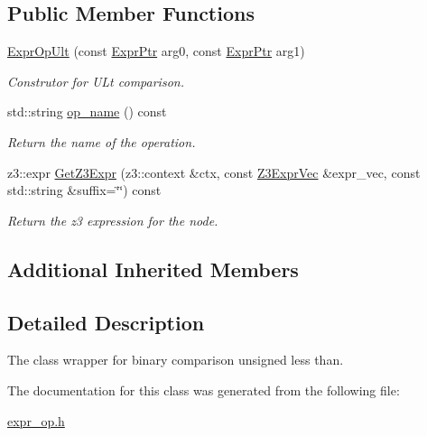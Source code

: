 \subsection*{Public Member Functions}
\begin{DoxyCompactItemize}
\item 
\mbox{\label{classilang_1_1_expr_op_ult_af85c43f8a1b8788150b2515b3a8baa77}} 
\mbox{\hyperlink{classilang_1_1_expr_op_ult_af85c43f8a1b8788150b2515b3a8baa77}{Expr\+Op\+Ult}} (const \mbox{\hyperlink{classilang_1_1_expr_a85952b6a34620c4c8cab6bac9c9fdf8c}{Expr\+Ptr}} arg0, const \mbox{\hyperlink{classilang_1_1_expr_a85952b6a34620c4c8cab6bac9c9fdf8c}{Expr\+Ptr}} arg1)
\begin{DoxyCompactList}\small\item\em Construtor for U\+Lt comparison. \end{DoxyCompactList}\item 
\mbox{\label{classilang_1_1_expr_op_ult_a383f22bb4c87788df50bf69ae7b81ebf}} 
std\+::string \mbox{\hyperlink{classilang_1_1_expr_op_ult_a383f22bb4c87788df50bf69ae7b81ebf}{op\+\_\+name}} () const
\begin{DoxyCompactList}\small\item\em Return the name of the operation. \end{DoxyCompactList}\item 
\mbox{\label{classilang_1_1_expr_op_ult_a5e8dc7dde3200c60b837574a0241e560}} 
z3\+::expr \mbox{\hyperlink{classilang_1_1_expr_op_ult_a5e8dc7dde3200c60b837574a0241e560}{Get\+Z3\+Expr}} (z3\+::context \&ctx, const \mbox{\hyperlink{namespaceilang_adc4eee919aa24fff882d03a48d733c19}{Z3\+Expr\+Vec}} \&expr\+\_\+vec, const std\+::string \&suffix=\char`\"{}\char`\"{}) const
\begin{DoxyCompactList}\small\item\em Return the z3 expression for the node. \end{DoxyCompactList}\end{DoxyCompactItemize}
\subsection*{Additional Inherited Members}


\subsection{Detailed Description}
The class wrapper for binary comparison unsigned less than. 

The documentation for this class was generated from the following file\+:\begin{DoxyCompactItemize}
\item 
\mbox{\hyperlink{expr__op_8h}{expr\+\_\+op.\+h}}\end{DoxyCompactItemize}
